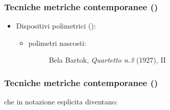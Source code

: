 \begin{frame}
    \frametitle{Tecniche metriche contemporanee ()}

    \begin{itemize}

        \item Dispositivi polimetrici ():

        \begin{itemize}

            \item polimetri nascosti:

                \begin{center}
                    \begin{figure}
                        \caption{Bela Bartok, \emph{Quartetto n.3} (1927), II}
                    \end{figure}
                \end{center}

        \end{itemize}

    \end{itemize}

\end{frame}

\begin{frame}
    \frametitle{Tecniche metriche contemporanee ()}


    che in notazione esplicita diventano:

    \begin{center}
    \end{center}

\end{frame}

